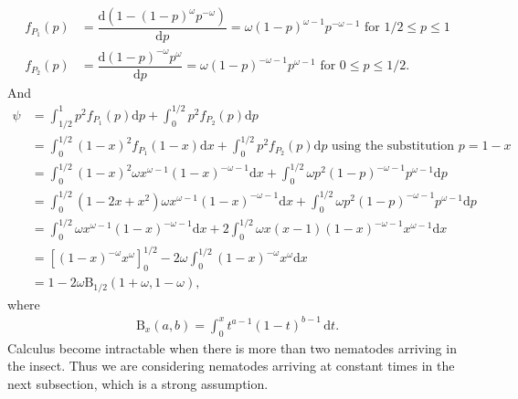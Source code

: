 \documentclass{article}
\newcommand{\ud}{{\mathrm{d}}}
\begin{document}
  \begin{align}
  f_{P_1}(p) &= \dfrac{ \ud (1-(1-p)^{\omega} p^{-\omega}) }{ \ud p} =  \omega (1-p)^{\omega-1} p^{-\omega-1}  \text{ for } 1/2 \leq p \leq 1\\
  f_{P_2}(p) &= \dfrac{ \ud (1-p)^{-\omega} p^\omega }{ \ud p} =  \omega (1-p)^{-\omega-1} p^{\omega-1} \text{ for } 0 \leq p \leq 1/2.
  \end{align}
  And 
  \begin{align}
  \psi &= \int_{1/2}^{1} p^2 f_{P_1}(p) \ud p + \int_{0}^{1/2} p^2 f_{P_2}(p) \ud p \\
  &=\int_{0}^{1/2} (1-x)^2 f_{P_1}(1-x) \ud x + \int_{0}^{1/2} p^2 f_{P_2}(p) \ud p  \text{ using the substitution } p=1-x\\
  &= \int_{0}^{1/2} (1-x)^2 \omega x^{\omega-1} (1-x)^{-\omega-1} \ud x + \int_{0}^{1/2} \omega p^2 (1-p)^{-\omega-1} p^{\omega-1} \ud p \\
  &= \int_{0}^{1/2} (1-2x+x^2) \omega x^{\omega-1} (1-x)^{-\omega-1} \ud x + \int_{0}^{1/2} \omega p^2 (1-p)^{-\omega-1} p^{\omega-1} \ud p \\
  &= \int_{0}^{1/2} \omega x^{\omega-1} (1-x)^{-\omega-1} \ud x +2   \int_{0}^{1/2} \omega x(x-1) (1-x)^{-\omega-1} x^{\omega-1} \ud x \\
  &= [(1-x)^{-\omega} x^\omega]_{0}^{1/2} -2  \omega \int_{0}^{1/2}  (1-x)^{-\omega} x^{\omega}  \ud x \\
  &= 1- 2 \omega \mathrm{B}_{1/2}(1+\omega,1-\omega),
\end{align}
where
\begin{align}
\mathrm{B}_x(a,b) = \int_0^x t^{a-1}(1-t)^{b-1}\,\ud t.
\end{align}
Calculus become intractable when there is more than two nematodes arriving in the insect. Thus we are considering nematodes arriving at constant times in the next subsection, which is a strong assumption.
\end{document}
